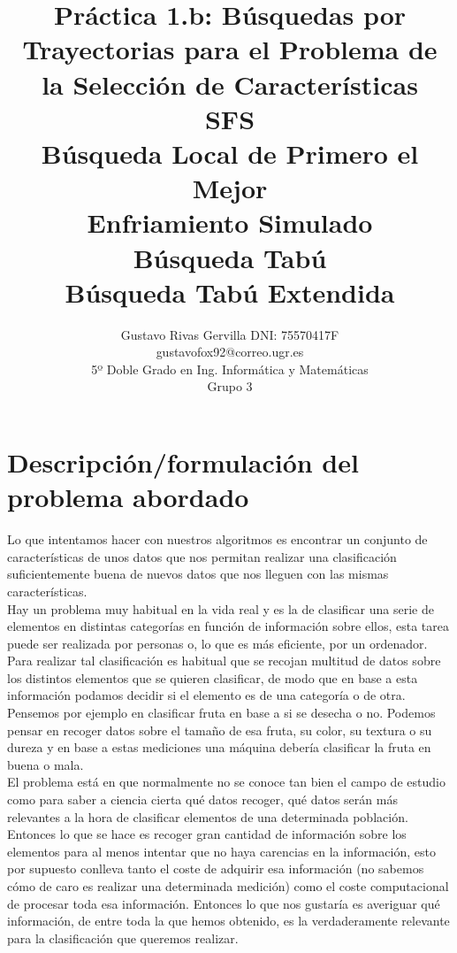 \documentclass[10pt,a4paper]{article}
\author{Gustavo Rivas Gervilla DNI: 75570417F \\ gustavofox92@correo.ugr.es \\5º Doble Grado en Ing. Informática y Matemáticas \\Grupo 3}
\title{Práctica 1.b: Búsquedas por Trayectorias para el Problema de la Selección de Características \\ SFS \\ Búsqueda Local de Primero el Mejor \\ Enfriamiento Simulado \\ Búsqueda Tabú \\ Búsqueda Tabú Extendida}
\date{}
\begin{document}
\lstset{language=Python, style=customPy}
\maketitle

\newpage

\tableofcontents

\newpage

\section{\color[rgb]{0.0,0.0,0.21}Descripción/formulación del problema abordado}
Lo que intentamos hacer con nuestros algoritmos es encontrar un conjunto de características de unos datos que nos permitan realizar una clasificación suficientemente buena de nuevos datos que nos lleguen con las mismas características.\\

Hay un problema muy habitual en la vida real y es la de clasificar una serie de elementos en distintas categorías en función de información sobre ellos, esta tarea puede ser realizada por personas o, lo que es más eficiente, por un ordenador. Para realizar tal clasificación es habitual que se recojan multitud de datos sobre los distintos elementos que se quieren clasificar, de modo que en base a esta información podamos decidir si el elemento es de una categoría o de otra. Pensemos por ejemplo en clasificar fruta en base a si se desecha o no. Podemos pensar en recoger datos sobre el tamaño de esa fruta, su color, su textura o su dureza y en base a estas mediciones una máquina debería clasificar la fruta en buena o mala.\\

El problema está en que normalmente no se conoce tan bien el campo de estudio como para saber a ciencia cierta qué datos recoger, qué datos serán más relevantes a la hora de clasificar elementos de una determinada población. Entonces lo que se hace es recoger gran cantidad de información sobre los elementos para al menos intentar que no haya carencias en la información, esto por supuesto conlleva tanto el coste de adquirir esa información (no sabemos cómo de caro es realizar una determinada medición) como el coste computacional de procesar toda esa información. Entonces lo que nos gustaría es averiguar qué información, de entre toda la que hemos obtenido, es la verdaderamente relevante para la clasificación que queremos realizar.\\
\end{document}
